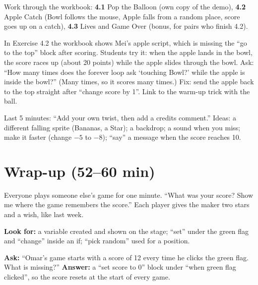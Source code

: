 Work through the workbook: \textbf{4.1} Pop the Balloon (own copy of the demo), \textbf{4.2} Apple Catch (Bowl follows the mouse, Apple falls from a random place, score goes up on a catch), \textbf{4.3} Lives and Game Over (bonus, for pairs who finish 4.2).

\begin{bughunt}
In Exercise 4.2 the workbook shows Mei's apple script, which is missing the \enquote{go to the top} block after scoring. Students try it: when the apple lands in the bowl, the score races up (about 20 points) while the apple slides through the bowl. Ask: \enquote{How many times does the forever loop ask \enquote{touching Bowl?} while the apple is inside the bowl?} (Many times, so it scores many times.) Fix: send the apple back to the top straight after \enquote{change score by 1}. Link to the warm-up trick with the ball.
\end{bughunt}

\begin{freebuild}
Last 5 minutes: \enquote{Add your own twist, then add a credits comment.} Ideas: a different falling sprite (Bananas, a Star); a backdrop; a sound when you miss; make it faster (change $-5$ to $-8$); \enquote{say} a message when the score reaches 10.
\end{freebuild}

\section{Wrap-up (52--60 min)}
\begin{teacherscript}
Everyone plays someone else's game for one minute. \enquote{What was your score? Show me where the game remembers the score.} Each player gives the maker two stars and a wish, like last week.
\end{teacherscript}

\begin{formativecheck}
\textbf{Look for:} a variable created and shown on the stage; \enquote{set} under the green flag and \enquote{change} inside an if; \enquote{pick random} used for a position.

\textbf{Ask:} \enquote{Omar's game starts with a score of 12 every time he clicks the green flag. What is missing?}
\textbf{Answer:} a \enquote{set score to 0} block under \enquote{when green flag clicked}, so the score resets at the start of every game.
\end{formativecheck}

